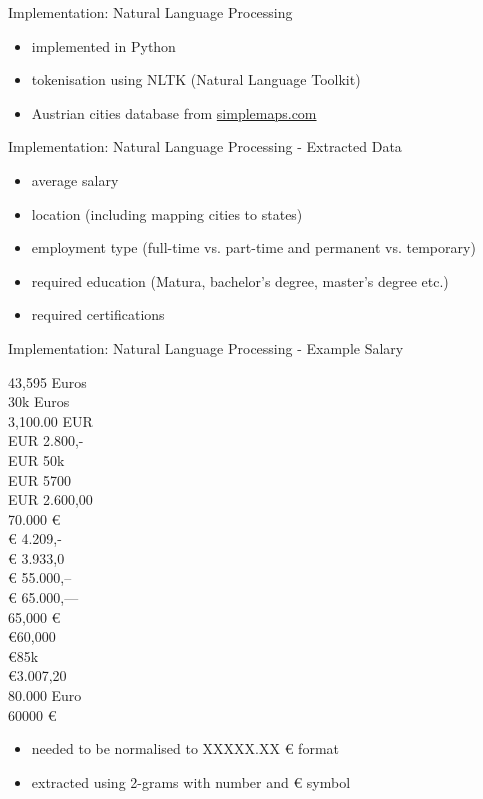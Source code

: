 \documentclass[aspectratio=169]{beamer}
\begin{document}
  \begin{frame}{Implementation: Natural Language Processing}
    \begin{itemize}
      \item implemented in Python
      \item tokenisation using NLTK (Natural Language Toolkit)
      \item Austrian cities database from \href{https://simplemaps.com}{simplemaps.com}
    \end{itemize}
  \end{frame}

  \begin{frame}{Implementation: Natural Language Processing - Extracted Data}
    \begin{itemize}
      \item average salary
      \item location (including mapping cities to states)
      \item employment type (full-time vs. part-time and permanent vs. temporary)
      \item required education (Matura, bachelor's degree, master's degree etc.)
      \item required certifications
    \end{itemize}
  \end{frame}

  \begin{frame}{Implementation: Natural Language Processing - Example Salary}
    \begin{multicols}{3}
      43,595 Euros \\
      30k Euros \\
      3,100.00 EUR \\
      EUR 2.800,- \\
      EUR 50k \\
      EUR 5700 \\
      EUR 2.600,00 \\
      70.000 € \\
      € 4.209,- \\
      € 3.933,0 \\
      € 55.000,-- \\
      € 65.000,--- \\
      65,000 € \\
      €60,000 \\
      €85k \\
      €3.007,20 \\
      80.000 Euro \\
      60000 €
    \end{multicols}

    \begin{itemize}
      \item needed to be normalised to XXXXX.XX € format
      \item extracted using 2-grams with number and € symbol
    \end{itemize}
  \end{frame}
\end{document}
